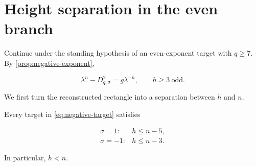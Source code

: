 %
%
\section{Height separation in the even branch}
\label{sec:height}

Continue under the standing hypothesis of an even-exponent target with
$q\geqslant7$.
By \cref{prop:negative-exponent},

\begin{equation}
 \lambda^n-D_{q,\sigma}^2=g\lambda^{-h},
 \qquad
 h\geqslant3\ \text{odd}.
 \label{eq:negative-target}
\end{equation}

We first turn the reconstructed rectangle into a separation between $h$ and
$n$.

\begin{lemma}
\label{lem:height-separation}
Every target in \cref{eq:negative-target} satisfies

\begin{equation}
 \begin{array}{ll}
 \sigma=1:&h\leqslant n-5,\\
 \sigma=-1:&h\leqslant n-3.
 \end{array}
 \label{eq:height-separation}
\end{equation}

In particular, $h<n$.
\end{lemma}

